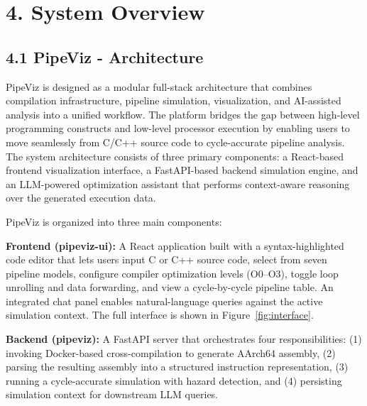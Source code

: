 \section*{4. System Overview}

\subsection*{4.1 PipeViz - Architecture}


PipeViz is designed as a modular full-stack architecture that combines compilation infrastructure, pipeline simulation, visualization, and AI-assisted analysis into a unified workflow. The platform bridges the gap between high-level programming constructs and low-level processor execution by enabling users to move seamlessly from C/C++ source code to cycle-accurate pipeline analysis. The system architecture consists of three primary components: a React-based frontend visualization interface, a FastAPI-based \cite{fastapi} backend simulation engine, and an LLM-powered \cite{chatgpt, ollama} optimization assistant that performs context-aware reasoning over the generated execution data.

PipeViz is organized into three main components:

\textbf{Frontend (pipeviz-ui):} A React \cite{react, bun} application built with a syntax-highlighted code editor that lets users input C or C++ source code, select from seven pipeline models, configure compiler optimization levels (O0--O3), toggle loop unrolling and data forwarding, and view a cycle-by-cycle pipeline table. An integrated chat panel enables natural-language queries against the active simulation context. The full interface is shown in Figure~\ref{fig:interface}.

\textbf{Backend (pipeviz):} A FastAPI server that orchestrates four responsibilities: (1) invoking Docker-based \cite{docker} cross-compilation to generate AArch64 assembly, (2) parsing the resulting assembly into a structured instruction representation, (3) running a cycle-accurate simulation with hazard detection, and (4) persisting simulation context for downstream LLM queries.

